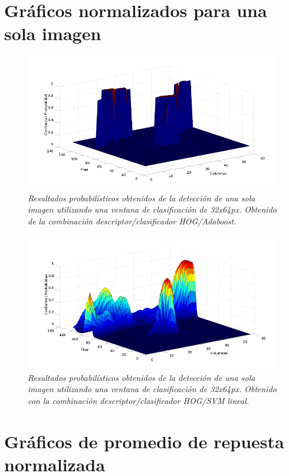  
\section{Gráficos normalizados para una sola imagen}

\begin{figure}[htc]
  \centering
  \includegraphics[scale=.6]{images/sig/boost/prueba2}
  \caption{\em  Resultados probabilísticos obtenidos de la detección de una sola imagen utilizando una ventana de clasificación de 32x64px. Obtenido de la combinación descriptor/clasificador HOG/Adaboost.}  
  \label{fig:gn1}
\end{figure}

\begin{figure}[htc]
  \centering
  \includegraphics[scale=.6]{images/sig/svm/prueba2}
  \caption{\em  Resultados probabilísticos obtenidos de la detección de una sola imagen utilizando una ventana de clasificación de 32x64px. Obtenido con la combinación descriptor/clasificador HOG/SVM lineal.}  
  \label{fig:gn2}
\end{figure}


\section{Gráficos de promedio de repuesta normalizada}


